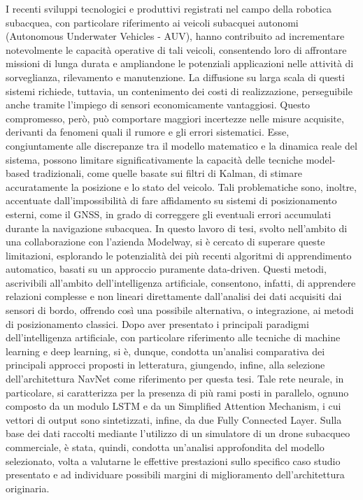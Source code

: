 
I recenti sviluppi tecnologici e produttivi registrati nel campo della robotica subacquea, con particolare riferimento ai veicoli subacquei autonomi (Autonomous Underwater Vehicles - AUV), hanno contribuito ad incrementare notevolmente le capacità operative di tali veicoli, consentendo loro di affrontare missioni di lunga durata e ampliandone le potenziali applicazioni nelle attività di sorveglianza, rilevamento e manutenzione. La diffusione su larga scala di questi sistemi richiede, tuttavia, un contenimento dei costi di realizzazione, perseguibile anche tramite l'impiego di sensori economicamente vantaggiosi. Questo compromesso, però, può comportare maggiori incertezze nelle misure acquisite, derivanti da fenomeni quali il rumore e gli errori sistematici. Esse, congiuntamente alle discrepanze tra il modello matematico e la dinamica reale del sistema, possono limitare significativamente la capacità delle tecniche model-based tradizionali, come quelle basate sui filtri di Kalman, di stimare accuratamente la posizione e lo stato del veicolo. Tali problematiche sono, inoltre, accentuate dall'impossibilità di fare affidamento su sistemi di posizionamento esterni, come il GNSS, in grado di correggere gli eventuali errori accumulati durante la navigazione subacquea. In questo lavoro di tesi, svolto nell'ambito di una collaborazione con l'azienda Modelway, si è cercato di superare queste limitazioni, esplorando le potenzialità dei più recenti algoritmi di apprendimento automatico, basati su un approccio puramente data-driven. Questi metodi, ascrivibili all'ambito dell'intelligenza artificiale, consentono, infatti, di apprendere relazioni complesse e non lineari direttamente dall'analisi dei dati acquisiti dai sensori di bordo, offrendo così una possibile alternativa, o integrazione, ai metodi di posizionamento classici. Dopo aver presentato i principali paradigmi dell'intelligenza artificiale, con particolare riferimento alle tecniche di machine learning e deep learning, si è, dunque, condotta un'analisi comparativa dei principali approcci proposti in letteratura, giungendo, infine, alla selezione dell'architettura NavNet come riferimento per questa tesi. Tale rete neurale, in particolare, si caratterizza per la presenza di più rami posti in parallelo, ognuno composto da un modulo LSTM e da un Simplified Attention Mechanism, i cui vettori di output sono sintetizzati, infine, da due Fully Connected Layer. Sulla base dei dati raccolti mediante l'utilizzo di un simulatore di un drone subacqueo commerciale, è stata, quindi, condotta un'analisi approfondita del modello selezionato, volta a valutarne le effettive prestazioni sullo specifico caso studio presentato e ad individuare possibili margini di miglioramento dell'architettura originaria.